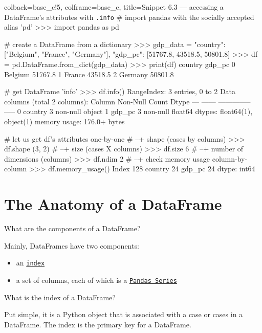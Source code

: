 \documentclass[a4paper,11pt]{book}
\numberwithin{figure}{chapter}
\numberwithin{table}{chapter}
\newcommand{\question}[1]{%
    \begin{tcolorbox}[colback=comp_c!10,colframe=comp_c,sidebyside align=top,width=\linewidth,before skip=1ex]
        #1
    \end{tcolorbox}
    \switchcolumn%
}
\newcommand{\note}[1]{%
    \begin{tcolorbox}[colback=white!0,colframe=white!10,width=\linewidth,before skip=1ex]
        #1
    \end{tcolorbox}
}
\begin{document}
\begin{pythoncode}[linenos=true]{colback=base_c!5, colframe=base_c, title=\sffamily Snippet 6.3 --- accessing a DataFrame's attributes with \texttt{.info}}
# import pandas with the socially accepted alias 'pd'
>>> import pandas as pd

# create a DataFrame from a dictionary
>>> gdp_data = {
	"country": ["Belgium", "France", "Germany"],
	"gdp_pc": [51767.8, 43518.5, 50801.8]
    }
>>> df = pd.DataFrame.from_dict(gdp_data)
>>> print(df)
   country   gdp_pc
0  Belgium  51767.8
1   France  43518.5
2  Germany  50801.8

# get DataFrame 'info'
>>> df.info()
RangeIndex: 3 entries, 0 to 2
Data columns (total 2 columns):
     Column   Non-Null Count  Dtype  
---  ------   --------------  -----  
 0   country  3 non-null      object 
 1   gdp_pc   3 non-null      float64
dtypes: float64(1), object(1)
memory usage: 176.0+ bytes

# let us get df's attributes one-by-one
# --+ shape (cases by columns)
>>> df.shape
(3, 2)
# --+ size (cases X columns)
>>> df.size
6
# --+ number of dimensions (columns)
>>> df.ndim
2
# --+ check memory usage column-by-column
>>> df.memory_usage()
Index      128
country     24
gdp_pc      24
dtype: int64

\end{pythoncode}

\section{The Anatomy of a DataFrame}

\begin{paracol}{2}
	\question{\raggedright What are the components of a DataFrame?}
	\note{Mainly, DataFrames have two components:
	
	\begin{itemize}
		\item an \href{https://pandas.pydata.org/docs/reference/api/pandas.DataFrame.index.html}{\texttt{index}}
		\item a set of columns, each of which is a \href{https://pandas.pydata.org/docs/reference/series.html}{\texttt{Pandas Series}}
	\end{itemize}
	}
\end{paracol}

\begin{paracol}{2}
	\question{\raggedright What is the index of a DataFrame?}
	\note{Put simple, it is a Python object that is associated with a case or cases in a DataFrame. The index is the primary key for a DataFrame.}
\end{paracol}
\end{document}
